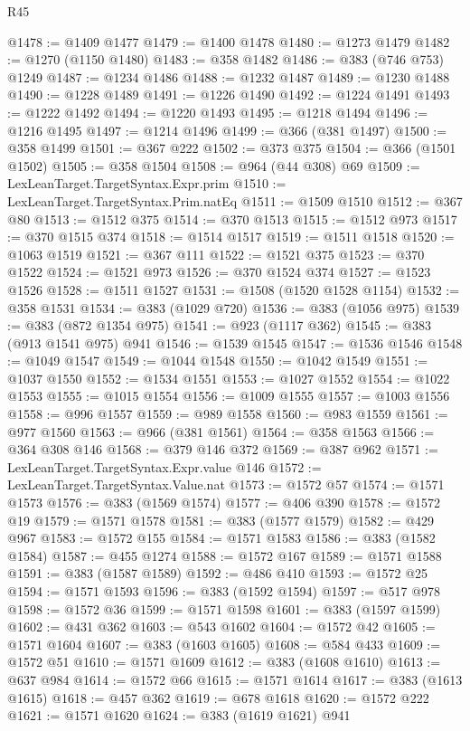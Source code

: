 \begin{lexlean}{R45}
\begin{coremodule}
@1478 := @1409 @1477
@1479 := @1400 @1478
@1480 := @1273 @1479
@1482 := @1270 (@1150 @1480)
@1483 := @358 @1482
@1486 := @383 (@746 @753) @1249
@1487 := @1234 @1486
@1488 := @1232 @1487
@1489 := @1230 @1488
@1490 := @1228 @1489
@1491 := @1226 @1490
@1492 := @1224 @1491
@1493 := @1222 @1492
@1494 := @1220 @1493
@1495 := @1218 @1494
@1496 := @1216 @1495
@1497 := @1214 @1496
@1499 := @366 (@381 @1497)
@1500 := @358 @1499
@1501 := @367 @222
@1502 := @373 @375
@1504 := @366 (@1501 @1502)
@1505 := @358 @1504
@1508 := @964 (@44 @308) @69
@1509 := LexLeanTarget.TargetSyntax.Expr.prim
@1510 := LexLeanTarget.TargetSyntax.Prim.natEq
@1511 := @1509 @1510
@1512 := @367 @80
@1513 := @1512 @375
@1514 := @370 @1513
@1515 := @1512 @973
@1517 := @370 @1515 @374
@1518 := @1514 @1517
@1519 := @1511 @1518
@1520 := @1063 @1519
@1521 := @367 @111
@1522 := @1521 @375
@1523 := @370 @1522
@1524 := @1521 @973
@1526 := @370 @1524 @374
@1527 := @1523 @1526
@1528 := @1511 @1527
@1531 := @1508 (@1520 @1528 @1154)
@1532 := @358 @1531
@1534 := @383 (@1029 @720)
@1536 := @383 (@1056 @975)
@1539 := @383 (@872 @1354 @975)
@1541 := @923 (@1117 @362)
@1545 := @383 (@913 @1541 @975) @941
@1546 := @1539 @1545
@1547 := @1536 @1546
@1548 := @1049 @1547
@1549 := @1044 @1548
@1550 := @1042 @1549
@1551 := @1037 @1550
@1552 := @1534 @1551
@1553 := @1027 @1552
@1554 := @1022 @1553
@1555 := @1015 @1554
@1556 := @1009 @1555
@1557 := @1003 @1556
@1558 := @996 @1557
@1559 := @989 @1558
@1560 := @983 @1559
@1561 := @977 @1560
@1563 := @966 (@381 @1561)
@1564 := @358 @1563
@1566 := @364 @308 @146
@1568 := @379 @146 @372
@1569 := @387 @962
@1571 := LexLeanTarget.TargetSyntax.Expr.value @146
@1572 := LexLeanTarget.TargetSyntax.Value.nat
@1573 := @1572 @57
@1574 := @1571 @1573
@1576 := @383 (@1569 @1574)
@1577 := @406 @390
@1578 := @1572 @19
@1579 := @1571 @1578
@1581 := @383 (@1577 @1579)
@1582 := @429 @967
@1583 := @1572 @155
@1584 := @1571 @1583
@1586 := @383 (@1582 @1584)
@1587 := @455 @1274
@1588 := @1572 @167
@1589 := @1571 @1588
@1591 := @383 (@1587 @1589)
@1592 := @486 @410
@1593 := @1572 @25
@1594 := @1571 @1593
@1596 := @383 (@1592 @1594)
@1597 := @517 @978
@1598 := @1572 @36
@1599 := @1571 @1598
@1601 := @383 (@1597 @1599)
@1602 := @431 @362
@1603 := @543 @1602
@1604 := @1572 @42
@1605 := @1571 @1604
@1607 := @383 (@1603 @1605)
@1608 := @584 @433
@1609 := @1572 @51
@1610 := @1571 @1609
@1612 := @383 (@1608 @1610)
@1613 := @637 @984
@1614 := @1572 @66
@1615 := @1571 @1614
@1617 := @383 (@1613 @1615)
@1618 := @457 @362
@1619 := @678 @1618
@1620 := @1572 @222
@1621 := @1571 @1620
@1624 := @383 (@1619 @1621) @941

\end{coremodule}
\end{lexlean}
